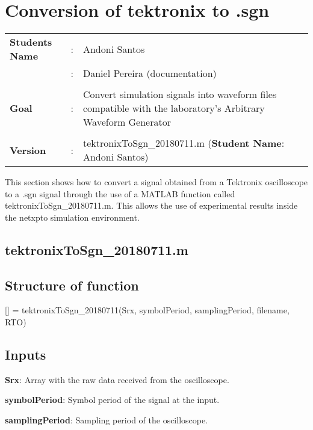\clearpage

\section{Conversion of tektronix to .sgn}

\begin{tcolorbox}	
	\begin{tabular}{p{2.75cm} p{0.2cm} p{10.5cm}} 	
		\textbf{Students Name}  &:& Andoni Santos\\
						   	    &:& Daniel Pereira (documentation)\\\\
		\textbf{Goal}           &:& Convert simulation signals into waveform files compatible with the laboratory's Arbitrary Waveform Generator\\\\
		\textbf{Version}        &:& tektronixToSgn\_20180711.m (\textbf{Student Name}: Andoni Santos)
	\end{tabular}
\end{tcolorbox}


This section shows how to convert a signal obtained from a Tektronix oscilloscope to a .sgn signal through the use of a MATLAB function called tektronixToSgn\_20180711.m. This allows the use of experimental results inside the netxpto simulation environment.

\subsection{tektronixToSgn\_20180711.m}

\subsection*{Structure of function}

[] = tektronixToSgn\_20180711(Srx, symbolPeriod, samplingPeriod, filename, RTO)

\subsection*{Inputs}

\indent

\textbf{Srx}: Array with the raw data received from the oscilloscope.
\bigskip

\textbf{symbolPeriod}: Symbol period of the signal at the input.
\bigskip

\textbf{samplingPeriod}: Sampling period of the oscilloscope.
\bigskip

